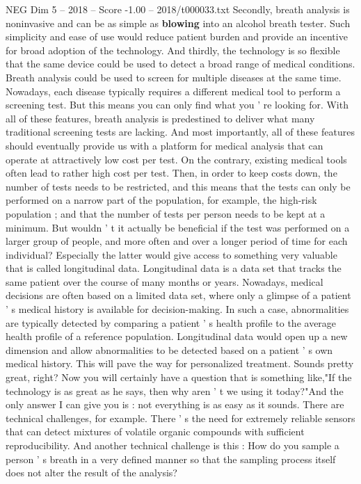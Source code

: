 \begin{textsample}{NEG Dim 5 – 2018 – Score -1.00 – 2018/t000033.txt}
Secondly, breath analysis is noninvasive and can be as simple as \textbf{blowing} into an alcohol breath tester.
Such simplicity and ease of use would reduce patient burden and provide an incentive for broad adoption of the technology.
And thirdly, the technology is so flexible that the same device could be used to detect a broad range of medical conditions.
Breath analysis could be used to screen for multiple diseases at the same time.
Nowadays, each disease typically requires a different medical tool to perform a screening test.
But this means you can only find what you ' re looking for.
With all of these features, breath analysis is predestined to deliver what many traditional screening tests are lacking.
And most importantly, all of these features should eventually provide us with a platform for medical analysis that can operate at attractively low cost per test.
On the contrary, existing medical tools often lead to rather high cost per test.
Then, in order to keep costs down, the number of tests needs to be restricted, and this means that the tests can only be performed on a narrow part of the population, for example, the high-risk population ; and that the number of tests per person needs to be kept at a minimum.
But wouldn ' t it actually be beneficial if the test was performed on a larger group of people, and more often and over a longer period of time for each individual?
Especially the latter would give access to something very valuable that is called longitudinal data.
Longitudinal data is a data set that tracks the same patient over the course of many months or years.
Nowadays, medical decisions are often based on a limited data set, where only a glimpse of a patient ' s medical history is available for decision-making.
In such a case, abnormalities are typically detected by comparing a patient ' s health profile to the average health profile of a reference population.
Longitudinal data would open up a new dimension and allow abnormalities to be detected based on a patient ' s own medical history.
This will pave the way for personalized treatment.
Sounds pretty great, right?
Now you will certainly have a question that is something like,"If the technology is as great as he says, then why aren ' t we using it today?"And the only answer I can give you is : not everything is as easy as it sounds.
There are technical challenges, for example.
There ' s the need for extremely reliable sensors that can detect mixtures of volatile organic compounds with sufficient reproducibility.
And another technical challenge is this : How do you sample a person ' s breath in a very defined manner so that the sampling process itself does not alter the result of the analysis?

\end{textsample}
